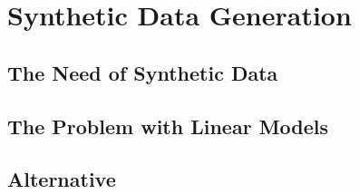 \chapter{Synthetic Data Generation}
\label{chap:MarketRisk}

\section{The Need of Synthetic Data}
\section{The Problem with Linear Models}
\section{Alternative}
